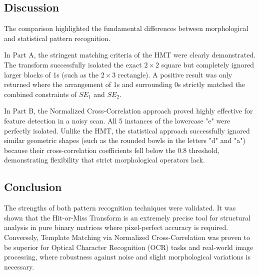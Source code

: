 \documentclass[11pt]{article}
\begin{document}
\subsection{Discussion}
The comparison highlighted the fundamental differences between morphological and statistical pattern recognition.

In Part A, the stringent matching criteria of the HMT were clearly demonstrated. The transform successfully isolated the exact $2 \times 2$ square but completely ignored larger blocks of 1s (such as the $2 \times 3$ rectangle). A positive result was only returned where the arrangement of 1s and surrounding 0s strictly matched the combined constraints of $SE_1$ and $SE_2$.

In Part B, the Normalized Cross-Correlation approach proved highly effective for feature detection in a noisy scan. All 5 instances of the lowercase "e" were perfectly isolated. Unlike the HMT, the statistical approach successfully ignored similar geometric shapes (such as the rounded bowls in the letters "d" and "a") because their cross-correlation coefficients fell below the 0.8 threshold, demonstrating flexibility that strict morphological operators lack.

\subsection{Conclusion}
The strengths of both pattern recognition techniques were validated. It was shown that the Hit-or-Miss Transform is an extremely precise tool for structural analysis in pure binary matrices where pixel-perfect accuracy is required. Conversely, Template Matching via Normalized Cross-Correlation was proven to be superior for Optical Character Recognition (OCR) tasks and real-world image processing, where robustness against noise and slight morphological variations is necessary.


\renewcommand{\bibname}{References}

\end{document}
